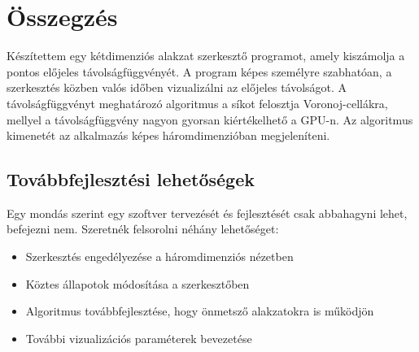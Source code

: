 \chapter{Összegzés}
\label{ch:sum}


Készítettem egy kétdimenziós alakzat szerkesztő programot, amely kiszámolja a pontos előjeles távolságfüggvényét. A program képes személyre szabhatóan, a szerkesztés közben valós időben vizualizálni az előjeles távolságot. A távolságfüggvényt meghatározó algoritmus a síkot felosztja Voronoj-cellákra, mellyel a távolságfüggvény nagyon gyorsan kiértékelhető a GPU-n. Az algoritmus kimenetét az alkalmazás képes háromdimenzióban megjeleníteni.


\section{Továbbfejlesztési lehetőségek}

Egy mondás szerint egy szoftver tervezését és fejlesztését csak abbahagyni lehet, befejezni nem. Szeretnék felsorolni néhány lehetőséget:

\begin{itemize}
    \item Szerkesztés engedélyezése a háromdimenziós nézetben
    \item Köztes állapotok módosítása a szerkesztőben
    \item Algoritmus továbbfejlesztése, hogy önmetsző alakzatokra is működjön
    \item További vizualizációs paraméterek bevezetése
\end{itemize}
